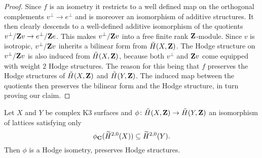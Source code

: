 \begin{proof}
    Since $f$ is an isometry it restricts to a well defined map on the orthogonal complements $v^\perp \to e^\perp$ and is moreover an isomorphism of additive structures. It then clearly descends to a well-defined additive isomorphism of the quotients ${v}^\perp / \mathbf Z{v} \to {e}^\perp / \mathbf Z{e}$. This makes ${v}^\perp / \mathbf Z{v}$ into a free finite rank $\mathbf Z$-module. Since $v$ is isotropic, ${v}^\perp / \mathbf Z{v}$ inherits a bilinear form from $\,\tilde{\!{H}}(X, \mathbf Z)$. The Hodge structure on ${v}^\perp / \mathbf Z{v}$ is also induced from $\,\tilde{\!{H}}(X, \mathbf Z)$, because both $v^\perp$ and $\mathbf Z v$ come equipped with weight $2$ Hodge structures. The reason for this being that $f$ preserves the Hodge structures of $\,\tilde{\!{H}}(X, \mathbf Z)$ and $\,\tilde{\!{H}}(Y, \mathbf Z)$.
    The induced map between the quotients then preserves the bilinear form and the Hodge structure, in turn proving our claim. 
\end{proof}



\begin{lemma}
    \label{isometry of Mukai lattices preserving H20}
    Let $X$ and $Y$ be complex K3 surfaces and $\phi \colon \,\tilde{\!{H}}(X, \mathbf Z) \to \,\tilde{\!{H}}(Y, \mathbf Z)$ an isomorphism of lattices satisfying only
    \begin{equation}
        \label{eq: H20 is mapped to H20}
        \phi_\mathbf C(\widetilde{H}^{2,0}(X)) \subseteq \widetilde{H}^{2,0}(Y).
    \end{equation}
    Then $\phi$ is a Hodge isometry, \ie preserves Hodge structures. 
\end{lemma}

